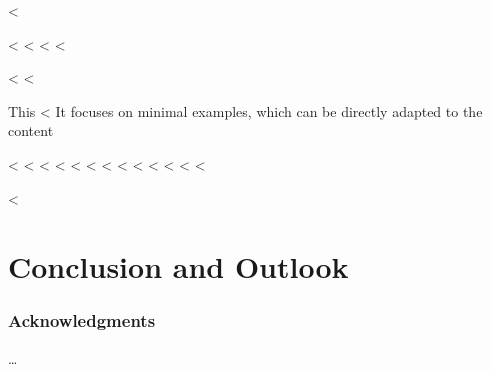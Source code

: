 \documentclass[runningheads,a4paper,english]{llncs}[2018/03/10]
\begin{document}
<%

<%
<%
\label{sec:latexhints}
<%
\label{chap:latexhints}
<%

<%
\newcount\LTGbeginlineexample
\newcount\LTGendlineexample
\newenvironment{ltgexample}%
{\LTGbeginlineexample=\numexpr\inputlineno+1\relax}%
{%
\LTGendlineexample=\numexpr\inputlineno-1\relax%

\tcbinputlisting{%
  listing only,
  listing file=\currfilepath,
  colback=green!5!white,
  colframe=green!25,
  coltitle=black!90,
  coltext=black!90,
  left=8mm,
  title=Corresponding \LaTeX{} code of \texttt{\currfilepath},
  listing options={%
    frame=none,
    language={[LaTeX]TeX},
    escapeinside={},
    firstline=\the\LTGbeginlineexample,
    lastline=\the\LTGendlineexample,
    firstnumber=\the\LTGbeginlineexample,
    basewidth=.5em,
    aboveskip=0mm,
    belowskip=0mm,
    numbers=left,
    xleftmargin=0mm,
    numberstyle=\tiny,
    numbersep=8pt%
  }
}
}%
<%

This <%
It focuses on minimal examples, which can be directly adapted to the content

<%
<%
<%
<%
<%
<%
<%
<%
<%
<%
<%
<%
<%

<%
\section{Conclusion and Outlook}
\label{sec:outlook}
\lipsum[1-2]

\subsubsection*{Acknowledgments}
\ldots
\end{document}
